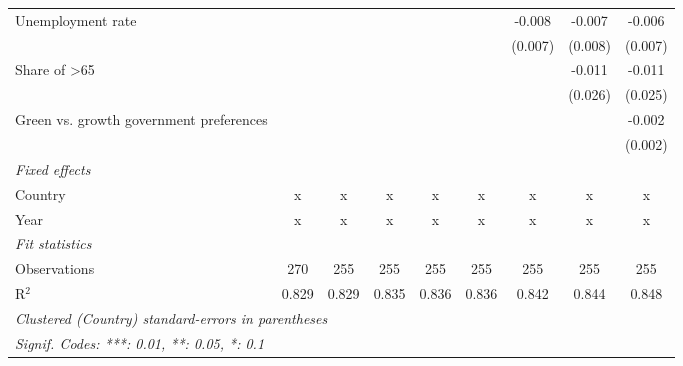 \begin{table}[htbp]
\begin{tabular}{lcccccccc}
      Unemployment rate                       &         &         &             &             &             & -0.008      & -0.007       & -0.006\\   
                                              &         &         &             &             &             & (0.007)     & (0.008)      & (0.007)\\   
      Share of >65                            &         &         &             &             &             &             & -0.011       & -0.011\\   
                                              &         &         &             &             &             &             & (0.026)      & (0.025)\\   
      Green vs. growth government preferences &         &         &             &             &             &             &              & -0.002\\   
                                              &         &         &             &             &             &             &              & (0.002)\\   
      \emph{Fixed effects}\\
      Country                                 & x       & x       & x           & x           & x           & x           & x            & x\\  
      Year                                    & x       & x       & x           & x           & x           & x           & x            & x\\  
      \midrule \emph{Fit statistics}\\
      Observations                            & 270     & 255     & 255         & 255         & 255         & 255         & 255          & 255\\  
      R$^2$                                   & 0.829   & 0.829   & 0.835       & 0.836       & 0.836       & 0.842       & 0.844        & 0.848\\  
      \midrule
      \multicolumn{9}{l}{\emph{Clustered (Country) standard-errors in parentheses}}\\
      \multicolumn{9}{l}{\emph{Signif. Codes: ***: 0.01, **: 0.05, *: 0.1}}\\
   \end{tabular}
\end{table}


